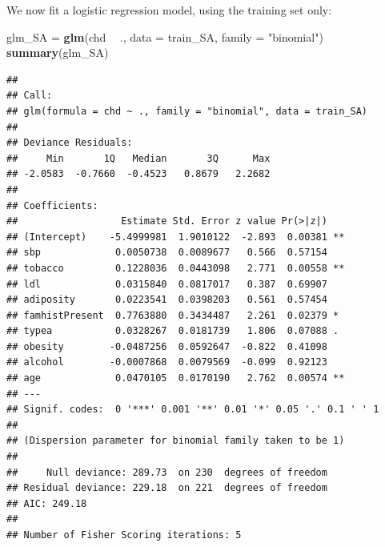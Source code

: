 \documentclass[10pt,ignorenonframetext,]{beamer}
\newenvironment{Shaded}{\begin{snugshade}}{\end{snugshade}}
\newcommand{\KeywordTok}[1]{\textcolor[rgb]{0.13,0.29,0.53}{\textbf{#1}}}
\newcommand{\DataTypeTok}[1]{\textcolor[rgb]{0.13,0.29,0.53}{#1}}
\newcommand{\StringTok}[1]{\textcolor[rgb]{0.31,0.60,0.02}{#1}}
\newcommand{\OperatorTok}[1]{\textcolor[rgb]{0.81,0.36,0.00}{\textbf{#1}}}
\newcommand{\NormalTok}[1]{#1}
\begin{document}
\begin{frame}[fragile]

We now fit a logistic regression model, using the training set only:

\footnotesize

\begin{Shaded}
\begin{Highlighting}[]
\NormalTok{glm_SA =}\StringTok{ }\KeywordTok{glm}\NormalTok{(chd }\OperatorTok{~}\StringTok{ }\NormalTok{., }\DataTypeTok{data =}\NormalTok{ train_SA, }\DataTypeTok{family =} \StringTok{"binomial"}\NormalTok{)}
\KeywordTok{summary}\NormalTok{(glm_SA)}
\end{Highlighting}
\end{Shaded}

\begin{verbatim}
## 
## Call:
## glm(formula = chd ~ ., family = "binomial", data = train_SA)
## 
## Deviance Residuals: 
##     Min       1Q   Median       3Q      Max  
## -2.0583  -0.7660  -0.4523   0.8679   2.2682  
## 
## Coefficients:
##                  Estimate Std. Error z value Pr(>|z|)   
## (Intercept)    -5.4999981  1.9010122  -2.893  0.00381 **
## sbp             0.0050738  0.0089677   0.566  0.57154   
## tobacco         0.1228036  0.0443098   2.771  0.00558 **
## ldl             0.0315840  0.0817017   0.387  0.69907   
## adiposity       0.0223541  0.0398203   0.561  0.57454   
## famhistPresent  0.7763880  0.3434487   2.261  0.02379 * 
## typea           0.0328267  0.0181739   1.806  0.07088 . 
## obesity        -0.0487256  0.0592647  -0.822  0.41098   
## alcohol        -0.0007868  0.0079569  -0.099  0.92123   
## age             0.0470105  0.0170190   2.762  0.00574 **
## ---
## Signif. codes:  0 '***' 0.001 '**' 0.01 '*' 0.05 '.' 0.1 ' ' 1
## 
## (Dispersion parameter for binomial family taken to be 1)
## 
##     Null deviance: 289.73  on 230  degrees of freedom
## Residual deviance: 229.18  on 221  degrees of freedom
## AIC: 249.18
## 
## Number of Fisher Scoring iterations: 5
\end{verbatim}

\normalsize

\end{frame}
\end{document}
